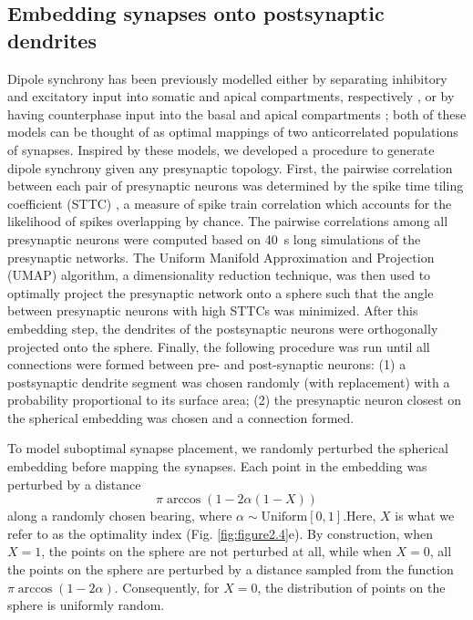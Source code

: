 \subsection{Embedding synapses onto postsynaptic dendrites}
Dipole synchrony has been previously modelled either by separating inhibitory and excitatory input into somatic and apical compartments, respectively \cite{Nunez2006}, or by having counterphase input into the basal and apical compartments \cite{Jones2009, Studenova2022}; both of these models can be thought of as optimal mappings of two anticorrelated populations of synapses. Inspired by these models, we developed a procedure to generate dipole synchrony given any presynaptic topology. First, the pairwise correlation between each pair of presynaptic neurons was determined by the spike time tiling coefficient (STTC) \cite{Cutts2014}, a measure of spike train correlation which accounts for the likelihood of spikes overlapping by chance. The pairwise correlations among all presynaptic neurons were computed based on \qty{40}{\second} long simulations of the presynaptic networks. The Uniform Manifold Approximation and Projection (UMAP) algorithm, a dimensionality reduction technique\cite{McInnes2018}, was then used to optimally project the presynaptic network onto a sphere such that the angle between presynaptic neurons with high STTCs was minimized. After this embedding step, the dendrites of the postsynaptic neurons were orthogonally projected onto the sphere. Finally, the following procedure was run until all connections were formed between pre- and post-synaptic neurons: (1) a postsynaptic dendrite segment was chosen randomly (with replacement) with a probability proportional to its surface area; (2) the presynaptic neuron closest on the spherical embedding was chosen and a connection formed.

To model suboptimal synapse placement, we randomly perturbed the spherical embedding before mapping the synapses. Each point in the embedding was perturbed by a distance \[\pi\arccos {(1-2\alpha\left(1-X\right))}\] along a randomly chosen bearing, where $\alpha\sim \mathrm{Uniform}[0,1]$.Here, $X$ is what we refer to as the optimality index (Fig. \ref{fig:figure2.4}e). By construction, when $X=1$, the points on the sphere are not perturbed at all, while when $X=0$, all the points on the sphere are perturbed by a distance sampled from the function $\pi\arccos{(1-2\alpha)}$. Consequently, for $X=0$, the distribution of points on the sphere is uniformly random.

